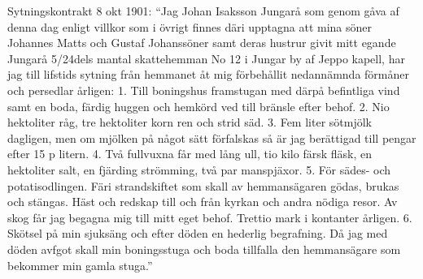 Sytningskontrakt 8 okt 1901: ``Jag Johan Isaksson Jungarå som genom gåva af denna dag enligt villkor som i övrigt finnes däri 	upptagna att mina söner Johannes Matts och Gustaf Johanssöner samt deras hustrur givit mitt egande Jungarå 5/24dels mantal skattehemman No 12 i Jungar by af Jeppo kapell, har jag till lifstids sytning från hemmanet åt mig förbehållit nedannämnda förmåner och persedlar årligen: 1. Till boningshus framstugan med därpå befintliga vind samt en boda, färdig huggen och hemkörd ved till bränsle efter behof. 2. Nio hektoliter råg, tre hektoliter korn ren och strid säd. 3. Fem liter sötmjölk dagligen, men om mjölken på något sätt förfalskas så är jag berättigad till pengar efter 15 p litern. 4. Två fullvuxna får med lång ull, tio kilo färsk fläsk, en hektoliter salt, en fjärding strömming, två par manspjäxor. 5. För sädes- och potatisodlingen. Färi strandskiftet som skall av hemmansägaren gödas, brukas och stängas. Häst och redskap till och från kyrkan och andra nödiga resor. Av skog får jag begagna mig till mitt eget behof. Trettio mark i kontanter årligen. 6. Skötsel på min sjuksäng och efter döden en hederlig begrafning. Då jag med döden avfgot skall min boningsstuga och boda tillfalla den hemmansägare som bekommer min gamla stuga.''


